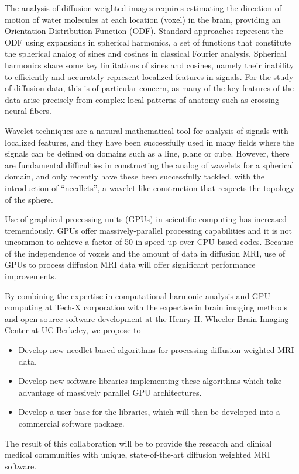 \documentclass[10pt]{article}
\begin{document}
The analysis of diffusion weighted images requires estimating the direction of
motion of water molecules at each location (voxel) in the brain, providing an
Orientation Distribution Function (ODF). Standard approaches represent
the ODF using expansions in spherical harmonics, a set of
functions that constitute the spherical analog of sines and cosines in
classical Fourier analysis.  Spherical harmonics share some key limitations of
sines and cosines, namely their inability to efficiently and accurately
represent localized features in signals. For the study of diffusion data, this
is of particular concern, as many of the key features of the data arise
precisely from complex local patterns of anatomy such as crossing neural
fibers.

Wavelet techniques are a natural mathematical tool for analysis of signals with
localized features, and they have been successfully used in many fields where
the signals can be defined on domains such as a line, plane or cube. However, there
are fundamental difficulties in constructing the analog of wavelets for a spherical
domain, and only recently have these been successfully tackled, with the
introduction of ``needlets'', a wavelet-like construction that respects the
topology of the sphere.

Use of graphical processing units (GPUs) in scientific computing has
increased tremendously. GPUs offer massively-parallel processing capabilities
and it is not uncommon to achieve a factor of 50 in speed up over CPU-based
codes. Because of the independence of voxels and the amount of data in
diffusion MRI, use of GPUs to process diffusion MRI data will offer significant
performance improvements.

By combining the expertise in computational harmonic analysis and GPU computing
at Tech-X corporation with the expertise in brain imaging methods and open
source software development at the Henry H. Wheeler Brain Imaging Center at UC
Berkeley, we propose to
\begin{itemize}
\item{Develop new needlet based algorithms for processing diffusion weighted
    MRI data.}
\item{Develop new software libraries implementing these algorithms which take
    advantage of massively parallel GPU architectures.}
\item{Develop a user base for the libraries, which will then be developed into
    a commercial software package.}
\end{itemize}
The result of this collaboration will be to provide the research and clinical
medical communities with unique, state-of-the-art diffusion weighted MRI
software.
\end{document}
